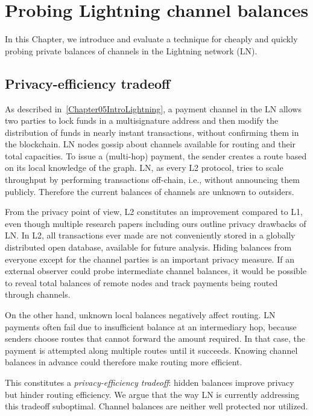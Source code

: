 \chapter{Probing Lightning channel balances}

\label{Chapter06LNprobing}

In this Chapter, we introduce and evaluate a technique for cheaply and quickly probing private balances of channels in the Lightning network (LN).

\section{Privacy-efficiency tradeoff}

As described in~\ref{Chapter05IntroLightning}, a payment channel in the LN allows two parties to lock funds in a multisignature address and then modify the distribution of funds in nearly instant transactions, without confirming them in the blockchain.
LN nodes gossip about channels available for routing and their total capacities.
To issue a (multi-hop) payment, the sender creates a route based on its local knowledge of the graph.
LN, as every L2 protocol, tries to scale throughput by performing transactions off-chain, i.e., without announcing them publicly.
Therefore the current balances of channels are unknown to outsiders.

From the privacy point of view, L2 constitutes an improvement compared to L1, even though multiple research papers including ours outline privacy drawbacks of LN.
In L2, all transactions ever made are not conveniently stored in a globally distributed open database, available for future analysis.
Hiding balances from everyone except for the channel parties is an important privacy measure.
If an external observer could probe intermediate channel balances, it would be possible to reveal total balances of remote nodes and track payments being routed through channels.

On the other hand, unknown local balances negatively affect routing.
LN payments often fail due to insufficient balance at an intermediary hop, because senders choose routes that cannot forward the amount required.
In that case, the payment is attempted along multiple routes until it succeeds.
Knowing channel balances in advance could therefore make routing more efficient.

This constitutes a \textit{privacy-efficiency tradeoff}: hidden balances improve privacy but hinder routing efficiency.
We argue that the way LN is currently addressing this tradeoff suboptimal.
Channel balances are neither well protected nor utilized.

